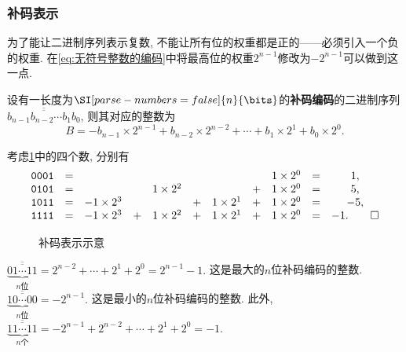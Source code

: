 \documentclass{ctexart}
\def\binaryseq#1{{\texttt{#1}}}
\begin{document}

\subsubsection{补码表示} %
\label{ssub:补码表示}

为了能让二进制序列表示复数, 不能让所有位的权重都是正的——必须引入一个负的权重. 在\eqref{eq:无符号整数的编码}中将最高位的权重$2^{n-1}$修改为$-2^{n-1}$可以做到这一点.
\begin{finale}
    \begin{definition}[补码编码]
        \label{def:补码编码}
        设有一长度为$\SI[parse-numbers=false]{n}{\bits}$的\textbf{补码编码}的二进制序列$\overline{\overline{b_{n-1}b_{n-2}\cdots b_1b_0}}$, 则其对应的整数为
        \begin{equation}
            \label{eq:补码编码}
            B = -b_{n-1} \times 2^{n-1} + b_{n-2} \times 2^{n-2} + \cdots + b_1 \times 2^1 + b_0 \times 2^0. 
        \end{equation}
    \end{definition}
\end{finale}
\begin{sample}
    \begin{ex}
        \label{ex:补码编码四位示意}
        考虑\cref{fig:补码表示示意}中的四个数, 分别有
        \[ \begin{array}{ccccccccccc}
            \text{\binaryseq{0001}} &=& & & & & & & 1\times 2^0 &=& 1,\\
            \text{\binaryseq{0101}} &=& & & 1\times 2^2 & & & +&1\times 2^0 &=& 5,\\
            \text{\binaryseq{1011}} &=& -1\times 2^3 & & & +&1\times 2^1 & +&1\times 2^0 &=& -5,\\
            \text{\binaryseq{1111}} &=& -1\times 2^3 & +&1\times 2^2 & +&1\times 2^1 & +&1\times 2^0 &=& -1. \qedhere
        \end{array} \]
    \end{ex}
\end{sample}
\begin{figure}[t]
    \centering
    \caption{补码表示示意}
    \label{fig:补码表示示意}
\end{figure}
\begin{sample}
    \begin{ex}
        \label{ex:补码编码极端值}
        $\displaystyle \underbrace{\overline{\overline{01\cdots 11}}}_{n\text{位}} = 2^{n-2} + \cdots + 2^1 + 2^0 = \boxed{2^{n-1} - 1.}$ 这是最大的$n$位补码编码的整数. $\displaystyle \underbrace{\overline{\overline{10\cdots 00}}}_{n\text{位}} = \boxed{-2^{n-1}.}$ 这是最小的$n$位补码编码的整数. 此外, $\displaystyle \underbrace{\overline{\overline{11\cdots 11}}}_{n\text{个}} = -2^{n-1} + 2^{n-2} + \cdots + 2^1 + 2^0 = \boxed{-1.}$
    \end{ex}
\end{sample}
\end{document}
